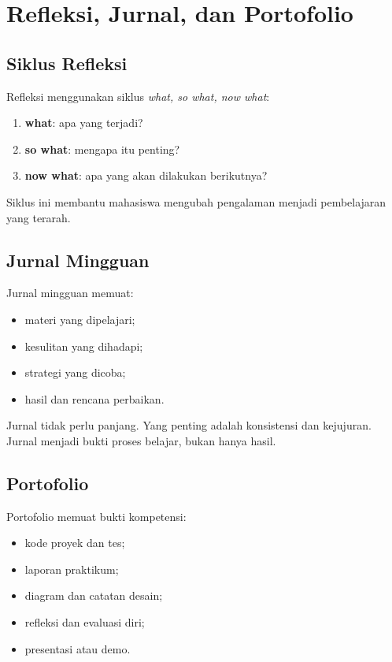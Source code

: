 \section{Refleksi, Jurnal, dan Portofolio}
\label{sec:ch17-refleksi}

\subsection{Siklus Refleksi}

Refleksi menggunakan siklus \emph{what, so what, now what}:
\begin{enumerate}[label=\arabic*.,leftmargin=*]
  \item \textbf{what}: apa yang terjadi?
  \item \textbf{so what}: mengapa itu penting?
  \item \textbf{now what}: apa yang akan dilakukan berikutnya?
\end{enumerate}

Siklus ini membantu mahasiswa mengubah pengalaman menjadi
pembelajaran yang terarah.

\subsection{Jurnal Mingguan}

Jurnal mingguan memuat:
\begin{itemize}[leftmargin=*]
  \item materi yang dipelajari;
  \item kesulitan yang dihadapi;
  \item strategi yang dicoba;
  \item hasil dan rencana perbaikan.
\end{itemize}

Jurnal tidak perlu panjang. Yang penting adalah konsistensi dan
kejujuran. Jurnal menjadi bukti proses belajar, bukan hanya hasil.

\subsection{Portofolio}

Portofolio memuat bukti kompetensi:
\begin{itemize}[leftmargin=*]
  \item kode proyek dan tes;
  \item laporan praktikum;
  \item diagram dan catatan desain;
  \item refleksi dan evaluasi diri;
  \item presentasi atau demo.
\end{itemize}

